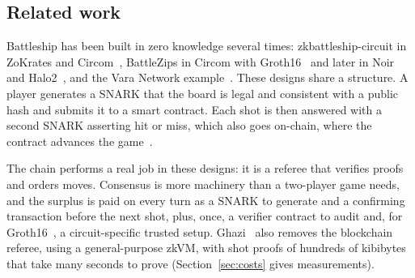 \documentclass[11pt]{article}
\theoremstyle{definition}
\theoremstyle{remark}
\begin{document}
\subsection{Related work}\label{sec:related}
Battleship has been built in zero knowledge several times: zkbattleship-circuit in ZoKrates and Circom~\cite{tommymsz006}, BattleZips in Circom with Groth16~\cite{battlezips} and later in Noir and Halo2~\cite{aztec}, and the Vara Network example~\cite{vara}. These designs share a structure. A player generates a SNARK that the board is legal and consistent with a public hash and submits it to a smart contract. Each shot is then answered with a second SNARK asserting hit or miss, which also goes on-chain, where the contract advances the game~\cite{battlezips}.

The chain performs a real job in these designs: it is a referee that verifies proofs and orders moves. Consensus is more machinery than a two-player game needs, and the surplus is paid on every turn as a SNARK to generate and a confirming transaction before the next shot, plus, once, a verifier contract to audit and, for Groth16~\cite{groth16}, a circuit-specific trusted setup. Ghazi~\cite{ghazi} also removes the blockchain referee, using a general-purpose zkVM, with shot proofs of hundreds of kibibytes that take many seconds to prove (Section~\ref{sec:costs} gives measurements).
\end{document}
